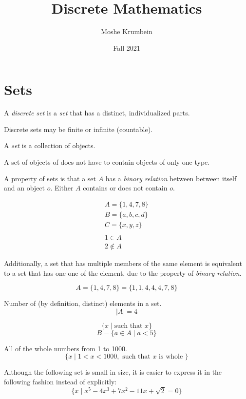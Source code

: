 \documentclass[00_complete]{subfiles}
\title{Discrete Mathematics}
\author{Moshe Krumbein}
\date{Fall 2021}
\begin{document}

\section{Sets}
\begin{definition}
A \emph{discrete set} is a \emph{set} that has a distinct, individualized parts.

Discrete sets may be finite or infinite (countable).
\end{definition}

\begin{definition}[Sets]
A \emph{set} is a collection of objects.

A set of objects of does not have to contain objects of only one type.

A property of sets is that a set $A$ has a \emph{binary relation} between between
itself and an object $o$. Either $A$ contains or does not contain $o$.
\end{definition}

\begin{example}
$$
\begin{gathered}
    A=\{1,4,7,8\} \\
    B=\{a,b,c,d\} \\
    C=\{x,y,z\} \\
    \\
    1 \in A \\
    2 \notin A
\end{gathered}
$$
\end{example}

Additionally, a set that has multiple members of the same element is
equivalent to a set that has one one of the element, due to the property of
\emph{binary relation}.

$$A = \{1,4,7,8\} = \{1,1,4,4,4,7,8\}$$

\begin{definition}
    Number of (by definition, distinct) elements in a set.
    $$|A| = 4$$
\end{definition}

\begin{definition}
$$\{ x \;|\; \text{such that } x \}$$
$$B = \{a \in A \;|\; a < 5 \}$$
\begin{example}
All of the whole numbers from 1 to 1000.
$$\{x \;|\; 1<x<1000, \text{ such that $x$ is whole }\}$$
\end{example}

Although the following set is small in size, it is easier to express it in
the following fashion instead of explicitly:
$$\{x \;|\; x^5-4x^3+7x^2-11x+\sqrt 2=0\}$$
\end{definition}
\end{document}
